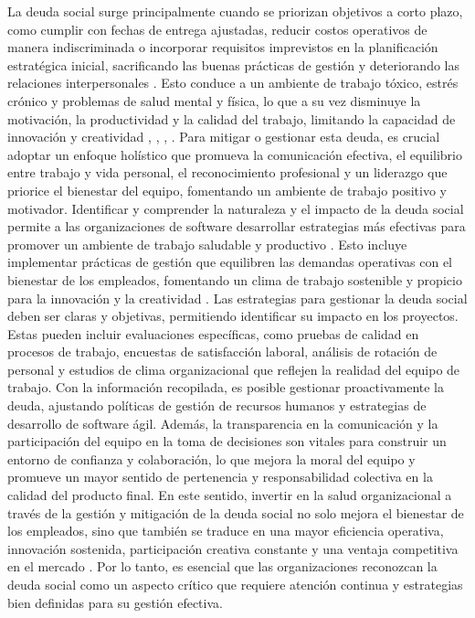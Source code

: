 La deuda social surge principalmente cuando se priorizan objetivos a corto plazo, como cumplir con fechas de entrega ajustadas, reducir costos operativos de manera indiscriminada o incorporar requisitos imprevistos en la planificación estratégica inicial, sacrificando las buenas prácticas de gestión y deteriorando las relaciones interpersonales \cite{caballero2021thesis}. Esto conduce a un ambiente de trabajo tóxico, estrés crónico y problemas de salud mental y física, lo que a su vez disminuye la motivación, la productividad y la calidad del trabajo, limitando la capacidad de innovación y creatividad \cite{caballero2022communitysmells}, \cite{tamburri2013socialdebt}, \cite{caballero2021thesis}, \cite{dreesen2021socialdebt}. Para mitigar o gestionar esta deuda, es crucial adoptar un enfoque holístico que promueva la comunicación efectiva, el equilibrio entre trabajo y vida personal, el reconocimiento profesional y un liderazgo que priorice el bienestar del equipo, fomentando un ambiente de trabajo positivo y motivador.
Identificar y comprender la naturaleza y el impacto de la deuda social permite a las organizaciones de software desarrollar estrategias más efectivas para promover un ambiente de trabajo saludable y productivo \cite{dreesen2021socialdebt}. Esto incluye implementar prácticas de gestión que equilibren las demandas operativas con el bienestar de los empleados, fomentando un clima de trabajo sostenible y propicio para la innovación y la creatividad \cite{caballero2022communitysmells}. Las estrategias para gestionar la deuda social deben ser claras y objetivas, permitiendo identificar su impacto en los proyectos. Estas pueden incluir evaluaciones específicas, como pruebas de calidad en procesos de trabajo, encuestas de satisfacción laboral, análisis de rotación de personal y estudios de clima organizacional que reflejen la realidad del equipo de trabajo. Con la información recopilada, es posible gestionar proactivamente la deuda, ajustando políticas de gestión de recursos humanos y estrategias de desarrollo de software ágil. Además, la transparencia en la comunicación y la participación del equipo en la toma de decisiones son vitales para construir un entorno de confianza y colaboración, lo que mejora la moral del equipo y promueve un mayor sentido de pertenencia y responsabilidad colectiva en la calidad del producto final. En este sentido, invertir en la salud organizacional a través de la gestión y mitigación de la deuda social no solo mejora el bienestar de los empleados, sino que también se traduce en una mayor eficiencia operativa, innovación sostenida, participación creativa constante y una ventaja competitiva en el mercado \cite{caballero2022communitysmells}. Por lo tanto, es esencial que las organizaciones reconozcan la deuda social como un aspecto crítico que requiere atención continua y estrategias bien definidas para su gestión efectiva.
